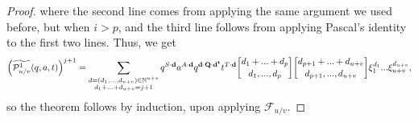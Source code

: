 \documentclass[10pt,a4paper]{amsart}
\begin{document}
\begin{proof}
where the second line comes from applying the same argument we used before, but when $i>p$, and the third line follows from applying Pascal's identity to the first two lines. Thus, we get 
\[
        \left(\widetilde{\mathcal{P}_{u/v}^1}(q,a,t)\right)^{j+1}=\sum_{\substack{\textbf{d}=(d_1,...,d_{u+v})\in \mathbb{N}^{u+v}\\d_1+...+d_{u+v}=j+1}}q^{S\cdot\bf{d} }a^{A\cdot \bf{d}}q^{\bf{d}\cdot Q\cdot \bf{d}^t} t^{T\cdot\bf{d}} {d_1+...+d_p\brack d_1,...,d_p}{d_{p+1}+...+d_{u+v}\brack d_{p+1},...,d_{u+v}}\xi_1^{d_1}...\xi_{u+v}^{d_{u+v}},
    \]
so the theorem follows by induction, upon applying $\mathcal{F}_{u/v}$.  
\end{proof}
\end{document}
